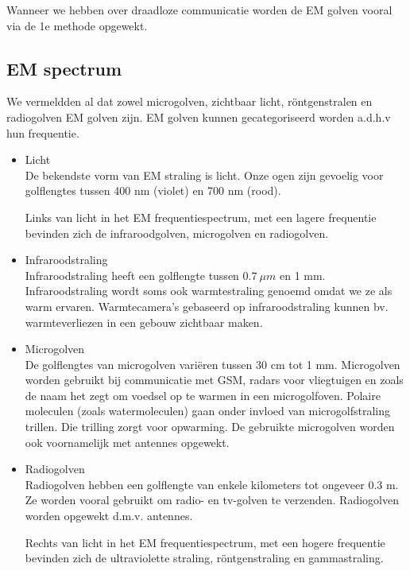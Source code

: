  Wanneer we hebben over draadloze communicatie worden de EM golven vooral via de 1e methode opgewekt.

 \subsection{EM spectrum}

 We vermeldden al dat zowel microgolven, zichtbaar licht, r\"ontgenstralen en radiogolven EM golven zijn. EM golven kunnen gecategoriseerd worden a.d.h.v hun frequentie. 



 \begin{itemize}
     \item Licht \\
     De bekendste vorm van EM straling is licht. Onze ogen zijn gevoelig voor golflengtes tussen 400 nm (violet) en 700 nm (rood). 
    
     Links van licht in het EM frequentiespectrum, met een lagere frequentie bevinden zich de infraroodgolven, microgolven en radiogolven.
    
     \item Infraroodstraling \\
     Infraroodstraling heeft een golflengte tussen $0.7 ~\mu m$ en 1 mm. Infraroodstraling wordt soms ook warmtestraling genoemd omdat we ze als warm ervaren. Warmtecamera's gebaseerd op infraroodstraling kunnen bv. warmteverliezen in een gebouw zichtbaar maken.
     \item Microgolven \\
     De golflengtes van microgolven vari\"eren tussen 30 cm tot 1 mm. Microgolven worden gebruikt bij communicatie met GSM, radars voor vliegtuigen en zoals de naam het zegt om voedsel op te warmen in een microgolfoven. Polaire moleculen (zoals watermoleculen) gaan onder invloed van microgolfstraling trillen. Die trilling zorgt voor opwarming. De gebruikte microgolven worden ook voornamelijk met antennes opgewekt.
     \item Radiogolven \\
     Radiogolven hebben een golflengte van enkele kilometers tot ongeveer 0.3 m. Ze worden vooral gebruikt om radio- en tv-golven te verzenden. Radiogolven worden opgewekt d.m.v. antennes.
    
     Rechts van licht in het EM frequentiespectrum, met een hogere frequentie bevinden zich de ultraviolette straling, r\"ontgenstraling en gammastraling.
    

\end{itemize}
